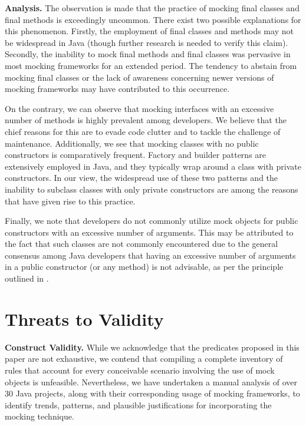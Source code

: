 \documentclass[conference]{IEEEtran}
\begin{document}
\textbf{Analysis.}
The observation is made that the practice of mocking final classes and final methods is exceedingly uncommon. There exist two possible explanations for this phenomenon. Firstly, the employment of final classes and methods may not be widespread in Java (though further research is needed to verify this claim). Secondly, the inability to mock final methods and final classes was pervasive in most mocking frameworks for an extended period. The tendency to abstain from mocking final classes or the lack of awareness concerning newer versions of mocking frameworks may have contributed to this occurrence.

On the contrary, we can observe that mocking interfaces with an excessive number of methods is highly prevalent among developers. We believe that the chief reasons for this are to evade code clutter and to tackle the challenge of maintenance. Additionally, we see that mocking classes with no public constructors is comparatively frequent. Factory and builder patterns are extensively employed in Java, and they typically wrap around a class with private constructors. In our view, the widespread use of these two patterns and the inability to subclass classes with only private constructors are among the reasons that have given rise to this practice.

Finally, we note that developers do not commonly utilize mock objects for public constructors with an excessive number of arguments. This may be attributed to the fact that such classes are not commonly encountered due to the general consensus among Java developers that having an excessive number of arguments in a public constructor (or any method) is not advisable, as per the principle outlined in \cite{cleancode}.



\section{Threats to Validity}

\textbf{Construct Validity.}
While we acknowledge that the predicates proposed in this paper are not exhaustive, we contend that compiling a complete inventory of rules that account for every conceivable scenario involving the use of mock objects is unfeasible. Nevertheless, we have undertaken a manual analysis of over 30 Java projects, along with their corresponding usage of mocking frameworks, to identify trends, patterns, and plausible justifications for incorporating the mocking technique. 
\end{document}
